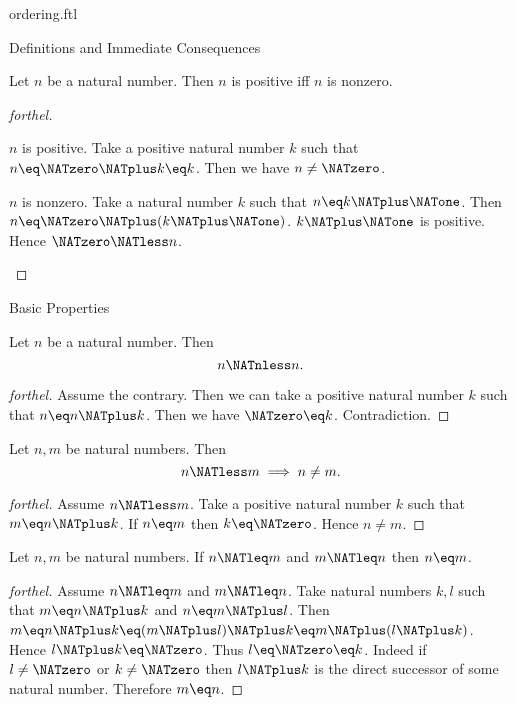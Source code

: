 \documentclass{naproche-library}
\begin{document}
\begin{smodule}[title=The Standard Ordering of the Natural Numbers]{ordering.ftl}
\begin{sfragment}{Definitions and Immediate Consequences}
  \begin{proposition}[forthel,id=ARITHMETIC_04_4826285599621120]
    Let $n$ be a natural number.
    Then $n$ is positive iff $n$ is nonzero.
  \end{proposition}
  \begin{proof}[forthel]
    \begin{case}{$n$ is positive.}
      Take a positive natural number $k$ such that $n \eq \NATzero \NATplus k \eq k$.
      Then we have $n \neq \NATzero$.
    \end{case}

    \begin{case}{$n$ is nonzero.}
      Take a natural number $k$ such that $n \eq k \NATplus \NATone$.
      Then $n \eq \NATzero \NATplus (k \NATplus \NATone)$.
      $k \NATplus \NATone$ is positive.
      Hence $\NATzero \NATless n$.
    \end{case}
  \end{proof}
\end{sfragment}

\begin{sfragment}{Basic Properties}
  \begin{proposition}[forthel,id=ARITHMETIC_04_1037693395927040]
    Let $n$ be a natural number.
    Then \[ n \NATnless n. \]
  \end{proposition}
  \begin{proof}[forthel]
    Assume the contrary.
    Then we can take a positive natural number $k$ such that $n \eq n \NATplus k$.
    Then we have $\NATzero \eq k$.
    Contradiction.
  \end{proof}

  \begin{proposition}[forthel,id=ARITHMETIC_04_8266284905005056]
    Let $n, m$ be natural numbers.
    Then \[ n \NATless m \implies n \neq m. \]
  \end{proposition}
  \begin{proof}[forthel]
    Assume $n \NATless m$.
    Take a positive natural number $k$ such that $m \eq n \NATplus k$.
    If $n \eq m$ then $k \eq \NATzero$.
    Hence $n \neq m$.
  \end{proof}

  \begin{proposition}[forthel,id=ARITHMETIC_04_4190604718243840]
    Let $n, m$ be natural numbers.
    If $n \NATleq m$ and $m \NATleq n$ then $n \eq m$.
  \end{proposition}
  \begin{proof}[forthel]
    Assume $n \NATleq m$ and $m \NATleq n$.
    Take natural numbers $k, l$ such that $m \eq n \NATplus k$ and $n \eq m \NATplus l$.
    Then $m
      \eq n \NATplus k
      \eq (m \NATplus l) \NATplus k
      \eq m \NATplus (l \NATplus k)$.
    Hence $l \NATplus k \eq \NATzero$.
    Thus $l \eq \NATzero \eq k$.
    Indeed if $l \neq \NATzero$ or $k \neq \NATzero$ then $l \NATplus k$ is the direct successor of
    some natural number.
    Therefore $m \eq n$.
  \end{proof}


\end{sfragment}
\end{smodule}
\end{document}
